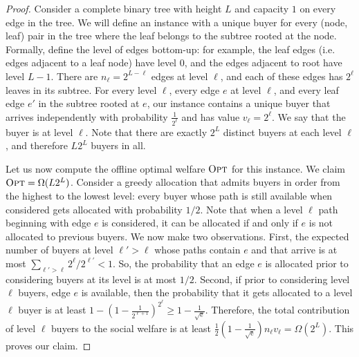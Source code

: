 \begin{proof}
  Consider a complete binary tree with height $L$ and capacity $1$ on
  every edge in the tree. We will define an instance with a unique
  buyer for every (node, leaf) pair in the tree where the leaf belongs
  to the subtree rooted at the node. Formally, define the level of
  edges bottom-up: for example, the leaf edges (i.e. edges adjacent to
  a leaf node) have level 0, and the edges adjacent to root have level
  $L-1$. There are $n_\ell=2^{L-\ell}$ edges at level $\ell$, and each
  of these edges has $2^{\ell}$ leaves in its subtree. For every level
  $\ell$, every edge $e$ at level $\ell$, and every leaf edge $e'$ in
  the subtree rooted at $e$, our instance contains a unique buyer that
  arrives independently with probability $\frac{1}{2^\ell}$ and has
  value $v_\ell=2^\ell$. We say that the buyer is at level
  $\ell$. Note that there are exactly $2^L$ distinct buyers at each
  level $\ell$, and therefore $L2^L$ buyers in all.


  Let us now compute the offline optimal welfare ${\normalfont\textsc{Opt}}$ for this
  instance. We claim ${\normalfont\textsc{Opt}}=\Omega(L2^L)$. Consider a greedy allocation
  that admits buyers in order from the highest to the lowest level:
  every buyer whose path is still available when considered gets
  allocated with probability $1/2$. Note that when a level $\ell$ path
  beginning with edge $e$ is considered, it can be allocated if and
  only if $e$ is not allocated to previous buyers. We now make two
  observations. First, the expected number of buyers at level
  $\ell'>\ell$ whose paths contain $e$ and that arrive is at most
  $\sum_{\ell'>\ell} 2^{\ell}/2^{\ell'} < 1$. So, the probability that
  an edge $e$ is allocated prior to considering buyers at its level is
  at most $1/2$. Second, if prior to considering level $\ell$ buyers,
  edge $e$ is available, then the probability that it gets allocated
  to a level $\ell$ buyer is at least
  $1-(1-\frac{1}{2^{\ell+1}})^{2^\ell}\geq 1-\frac{1}{\sqrt{\textrm{e}}}$. Therefore, the total
  contribution of level $\ell$ buyers to the social welfare is at
  least $\frac{1}{2}\left(1-\frac{1}{\sqrt{\textrm{e}}}\right)n_\ell v_\ell=\Omega(2^L)$. This proves our claim.


\end{proof}
